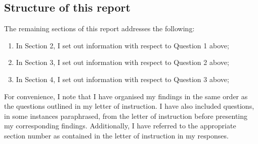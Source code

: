 \subsection{Structure of this report} %
\begin{myenum}
     \item The remaining sections of this report addresses the following:
         \begin{enumerate}
            \item In Section 2, I set out information with respect to Question 1 above;
            \item In Section 3, I set out information with respect to Question 2 above;
            \item In Section 4, I set out information with respect to Question 3 above;
         \end{enumerate}
     \item For convenience, I note that I have organised my findings in the same order as the questions outlined in my letter of instruction. I have also included questions, in some instances paraphrased, from the letter of instruction before presenting my corresponding findings. Additionally, I have referred to the appropriate section number as contained in the letter of instruction in my responses.
\end{myenum}
\label{sub:structure_of_this_report}



